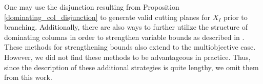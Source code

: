 \documentclass[11.5pt]{article}
\newtheorem{prop}{Proposition}
\newcommand{\su}[2][1]{\ensuremath{\displaystyle{\sum_{#1}^{#2}}}}
\newcommand{\dom}{\succ}
\begin{document}
One may use the disjunction resulting from Proposition \ref{dominating_col_disjunction} to generate valid cutting planes for $X_I$ prior to branching. Additionally, there are also ways to further utilize the structure of dominating columns in order to strengthen variable bounds as described in \citep[Theorem 3, Corollary 1 and 2]{gamrath2015}. These methods for strengthening bounds also extend to the multiobjective case. However, we did not find these methods to be advantageous in practice. Thus, since the description of these additional strategies is quite lengthy, we omit them from this work.\\ %

%
%
\end{document}
